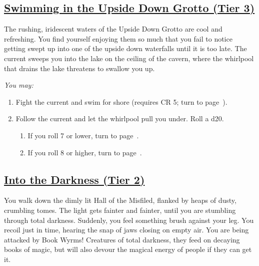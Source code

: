 \documentclass[sheet]{GL2020}
\begin{document}
\clearpage


\begin{center}\section*{\underline{Swimming in the Upside Down Grotto (Tier 3)}}\end{center}
\label{SwiminGrotto}

The rushing, iridescent waters of the Upside Down Grotto are cool and refreshing. You find yourself enjoying them so much that you fail to notice getting swept up into one of the upside down waterfalls until it is too late. The current sweeps you into the lake on the ceiling of the cavern, where the whirlpool that drains the lake threatens to swallow you up.

\vspace{0.5cm}

\begingroup
\itshape
You may:
\begin{enumerate}[A]
  \item Fight the current and swim for shore (requires CR 5; turn to page~\pageref{UpsideDownGrotto}).
	\item Follow the current and let the whirlpool pull you under. Roll a d20. 
	\begin{enumerate}
		\item If you roll 7 or lower, turn to page~\pageref{SlowBoatDarkRiver}.
		\item If you roll 8 or higher, turn to page~\pageref{UndergroundRiver}.
	\end{enumerate}
\end{enumerate}
\endgroup

\clearpage

\begin{center}\section*{\underline{Into the Darkness (Tier 2)}}\end{center}
\label{IntotheDarkness}

You walk down the dimly lit Hall of the Misfiled, flanked by heaps of dusty, crumbling tomes. The light gets fainter and fainter, until you are stumbling through total darkness. Suddenly, you feel something brush against your leg. You recoil just in time, hearing the snap of jaws closing on empty air. You are being attacked by Book Wyrms! Creatures of total darkness, they feed on decaying books of magic, but will also devour the magical energy of people if they can get it. 
\end{document}
